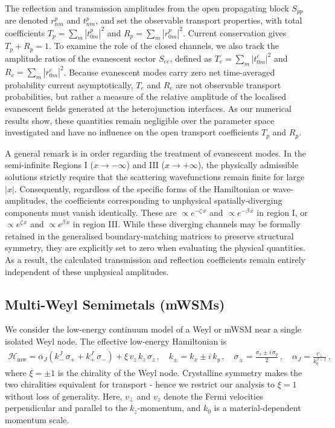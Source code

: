 \documentclass[aps,prb,onecolumn,longbibliography,nofootinbib,citeautoscript,10pt]{revtex4-2}
\begin{document}
The reflection and transmission amplitudes from the open propagating block $S_{pp}$ are denoted $r_{nm}^{p}$ and $t_{nm}^{p}$, and set the observable transport properties, with total coefficients $T_p = \sum_m |t_{0m}^{p}|^2$ and $R_p = \sum_m |r_{0m}^{p}|^2$. Current conservation gives $T_p + R_p = 1$. To examine the role of the closed channels, we also track the amplitude ratios of the evanescent sector $S_{ee}$, defined as $T_e = \sum_m |t_{0m}^{e}|^2$ and $R_e = \sum_m |r_{0m}^{e}|^2$. Because evanescent modes carry zero net time-averaged probability current asymptotically, $T_e$ and $R_e$ are not observable transport probabilities, but rather a measure of the relative amplitude of the localised evanescent fields generated at the heterojunction interfaces. As our numerical results show, these quantities remain negligible over the parameter space investigated and have no influence on the open transport coefficients $T_p$ and $R_p$.

A general remark is in order regarding the treatment of evanescent modes. In the semi-infinite Regions I ($x \rightarrow -\infty$) and III ($x \rightarrow +\infty$), the physically admissible solutions strictly require that the scattering wavefunctions remain finite for large $|x|$. Consequently, regardless of the specific forms of the Hamiltonian or wave-amplitudes, the coefficients corresponding to unphysical spatially-diverging components must vanish identically. These are $\propto e^{-\zeta \,x}$ and $\propto e^{-\beta \,x}$ in region I, or $\propto e^{ \zeta \,x}$ and $\propto e^{ \beta \,x}$ in region III. While these diverging channels may be formally retained in the generalised boundary-matching matrices to preserve structural symmetry, they are explicitly set to zero when evaluating the physical quantities. As a result, the calculated transmission and reflection coefficients remain entirely independent of these unphysical amplitudes.



\subsection{Multi-Weyl Semimetals (mWSMs)}\label{sec:multi_weyl}
We consider the low-energy continuum model of a Weyl or mWSM near a single isolated Weyl node. The effective low-energy Hamiltonian is~\cite{liu2017predicted, lundgren2014thermo, fang2012multi, Gang2011, Mukherjee2018}
\begin{align}
\mathcal{H}_{\text{mw}} = \alpha_J \left( k_-^J \, \sigma_+ + k_+^J  \,\sigma_- \right) 
+ \xi \,v_z\, k_z\, \sigma_z\,, \quad
k_\pm = k_x \pm i\, k_y \,, \quad \sigma_\pm = \frac{\sigma_x \pm i \, \sigma_y} {2}\,,
\quad \alpha_J = \frac{v_\perp} {k_0^{J-1}}\,,
\label{eq:mweyl_ham}
\end{align}
where $\xi = \pm 1$ is the chirality of the Weyl node. Crystalline symmetry makes the two chiralities equivalent for transport - hence we restrict our analysis to $\xi = 1$ without loss of generality. Here, $v_\perp$ and $v_z$ denote the Fermi velocities perpendicular and parallel to the $k_z$-momentum, and $k_0$ is a material-dependent momentum scale.
\end{document}
